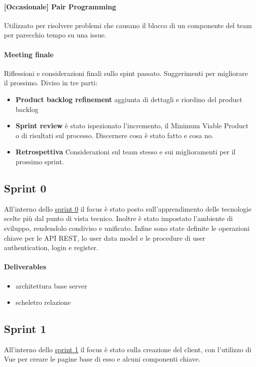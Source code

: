     \paragraph{[Occasionale] Pair Programming } Utilizzato per risolvere problemi che causano il blocco di un componente del team per parecchio tempo su una issue.
    \paragraph{Meeting finale}
        Riflessioni e considerazioni finali sullo spint passato. Suggerimenti per migliorare il prossimo. Diviso in tre parti: 
        \begin{itemize}
        \item\textbf{Product backlog refinement} aggiunta di dettagli e riordino del product backlog
        \item\textbf{Sprint review} è stato ispezionato l'incremento, il Minimum Viable Product o di risultati sul processo. Discernere cosa è stato fatto e cosa no.
        \item\textbf{Retrospettiva} Considerazioni sul team stesso e sui miglioramenti per il prossimo sprint. 
        \end{itemize}
        
        

\subsection{Sprint 0}
All'interno dello  \href{https://github.com/orgs/Weather-Vortex/projects/2}{sprint 0} il focus è stato posto sull'apprendimento delle tecnologie scelte più dal punto di vista tecnico. Inoltre è stato impostato l'ambiente di sviluppo, rendendolo condiviso e unificato. 
Infine sono state definite le operazioni chiave per le API REST, lo user data model e le procedure di user authentication, login e register.
\paragraph{Deliverables} 
\begin{itemize}
    \item architettura base server
    \item scheletro relazione
\end{itemize}


\subsection{Sprint 1}
All'interno dello  \href{https://github.com/orgs/Weather-Vortex/projects/3}{sprint 1} il focus è stato sulla creazione del client, con l'utilizzo di Vue per creare le pagine base di esso e alcuni componenti chiave.
